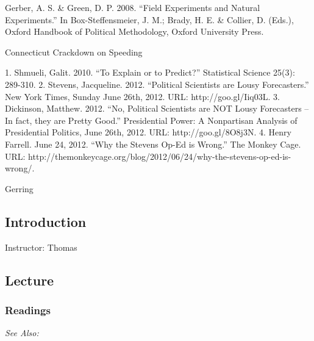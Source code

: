 \documentclass[12pt,a4paper]{article}
\newcommand{\thomas}{\vspace{1em}\noindent Instructor: Thomas\\}
\newcommand{\seealso}{\noindent \emph{See Also:}}
\begin{document}
Gerber, A. S. & Green, D. P. 2008. “Field Experiments and Natural Experiments.” In Box-Steffensmeier, J. M.; Brady, H. E. & Collier, D. (Eds.), Oxford Handbook of Political Methodology, Oxford University Press.

Connecticut Crackdown on Speeding





1. Shmueli, Galit. 2010. “To Explain or to Predict?” Statistical Science 25(3): 289-310.
2. Stevens, Jacqueline. 2012. “Political Scientists are Lousy Forecasters.” New York Times, Sunday June 26th, 2012.
URL: http://goo.gl/Iiq03L.
3. Dickinson, Matthew. 2012. “No, Political Scientists are NOT Lousy Forecasters – In fact, they are Pretty Good.”
Presidential Power: A Nonpartisan Analysis of Presidential Politics, June 26th, 2012. URL: http://goo.gl/8O8j3N.
4. Henry Farrell. June 24, 2012. “Why the Stevens Op-Ed is Wrong.” The Monkey Cage. URL:
http://themonkeycage.org/blog/2012/06/24/why-the-stevens-op-ed-is-wrong/. 

Gerring







\subsection{Introduction}
\emph{}

\thomas

\subsection*{Lecture}

\begin{itemize*}
\item 
\end{itemize*}

\subsubsection*{Readings}

\seealso





\end{document}
